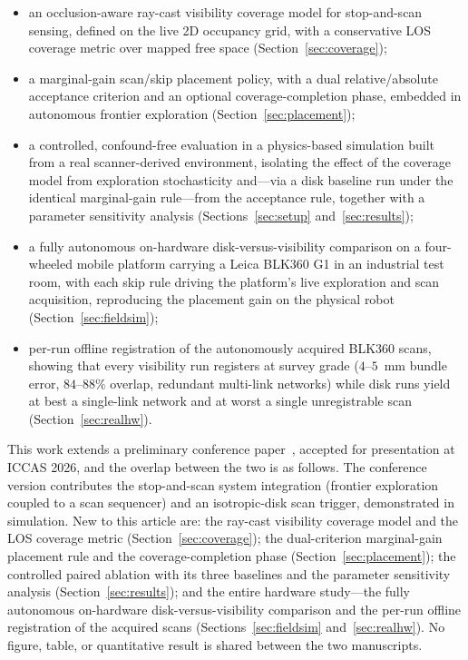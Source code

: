 \documentclass[sensors,article,submit,pdftex,moreauthors]{Definitions/mdpi}
\begin{document}
\begin{itemize}[leftmargin=*,labelsep=4.5mm]
\item an occlusion-aware ray-cast visibility coverage model for stop-and-scan
sensing, defined on the live 2D occupancy grid, with a conservative LOS
coverage metric over mapped free space (Section~\ref{sec:coverage});
\item a marginal-gain scan/skip placement policy, with a dual relative/absolute
acceptance criterion and an optional coverage-completion phase, embedded in
autonomous frontier exploration (Section~\ref{sec:placement});
\item a controlled, confound-free evaluation in a physics-based simulation built
from a real scanner-derived environment, isolating the effect of the coverage
model from exploration stochasticity and---via a disk baseline run under the
identical marginal-gain rule---from the acceptance rule, together with a
parameter sensitivity analysis (Sections~\ref{sec:setup}
and~\ref{sec:results});
\item a fully autonomous on-hardware disk-versus-visibility comparison on a
four-wheeled mobile platform carrying a Leica BLK360 G1 in an industrial test
room, with each skip rule driving the platform's live exploration and scan
acquisition, reproducing the placement gain on the physical robot
(Section~\ref{sec:fieldsim});
\item per-run offline registration of the autonomously acquired BLK360 scans,
showing that every visibility run registers at survey grade ($4$--$5$~mm bundle
error, $84$--$88\%$ overlap, redundant multi-link networks) while disk runs
yield at best a single-link network and at worst a single unregistrable scan
(Section~\ref{sec:realhw}).
\end{itemize}

This work extends a preliminary conference paper~\cite{iccas2026}, accepted
for presentation at ICCAS 2026, and the overlap between the two is as
follows. The conference version contributes the stop-and-scan system
integration (frontier exploration coupled to a scan sequencer) and an
isotropic-disk scan trigger, demonstrated in simulation. New to this article
are: the ray-cast visibility coverage model and the LOS coverage metric
(Section~\ref{sec:coverage}); the dual-criterion marginal-gain placement rule
and the coverage-completion phase (Section~\ref{sec:placement}); the
controlled paired ablation with its three baselines and the parameter
sensitivity analysis (Section~\ref{sec:results}); and the entire hardware
study---the fully autonomous on-hardware disk-versus-visibility comparison and
the per-run offline registration of the acquired scans
(Sections~\ref{sec:fieldsim} and~\ref{sec:realhw}). No figure, table, or
quantitative result is shared between the two manuscripts.
\end{document}
